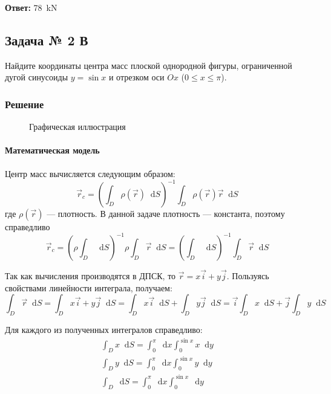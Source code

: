 \documentclass[a4paper,12pt]{article}
\newcommand*\diff{\mathop{}\!\mathrm{d}}
\begin{document}
\textbf{Ответ:} \SI{78}{\kilo\newton}

\subsection{Задача № 2 В}

Найдите координаты центра масс плоской однородной фигуры,
ограниченной дугой синусоиды \(y = \sin x\)
и отрезком оси \(Ox\) (\(0 \le x \le \pi\)).

\subsubsection{Решение}

\begin{figure}[htbp]
  \centering
  \caption{Графическая иллюстрация}\label{fig:2c}
\end{figure}

\paragraph{Математическая модель}
Центр масс вычисляется следующим образом:
\[
  \vec{r}_{c} =
    {\left(\int_{D} \rho(\vec{r}) \diff S\right)}^{-1}
    \int_{D} \rho(\vec{r}) \vec{r} \diff S
\]
где \(\rho(\vec{r})\) --- плотность.
В данной задаче плотность --- константа, поэтому справедливо
\begin{equation} \label{eq:2c-main}
  \vec{r}_{c} =
    {\left(\rho \int_{D} \diff S\right)}^{-1}
    \rho \int_{D} \vec{r} \diff S =
    {\left(\int_{D} \diff S\right)}^{-1}
    \int_{D} \vec{r} \diff S
\end{equation}

Так как вычисления производятся в ДПСК, то
\(\vec{r} = x \vec{i} + y \vec{j}\).
Пользуясь свойствами линейности интеграла, получаем:
\begin{equation} \label{eq:2c-main-1}
  \int_{D} \vec{r} \diff S
    = \int_{D} x \vec{i} + y \vec{j} \diff S
    = \int_{D} x \vec{i} \diff S + \int_{D} y \vec{j} \diff S
    = \vec{i} \int_{D} x \diff S + \vec{j} \int_{D} y \diff S
\end{equation}

Для каждого из полученных интегралов справедливо:
\begin{align}
  \int_{D} x \diff S = \int_{0}^{\pi} \diff x \int_{0}^{\sin x} x \diff y
  \label{eq:2c-1} \\
  \int_{D} y \diff S = \int_{0}^{\pi} \diff x \int_{0}^{\sin x} y \diff y
  \label{eq:2c-2} \\
  \int_{D} \diff S = \int_{0}^{\pi} \diff x \int_{0}^{\sin x} \diff y
  \label{eq:2c-3}
\end{align}
\end{document}
